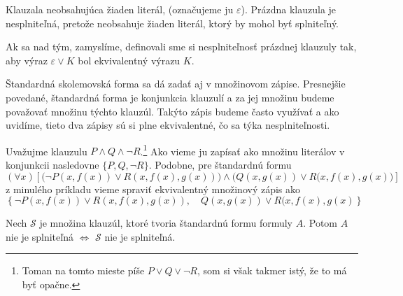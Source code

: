 \begin{definicia}
    Klauzala neobsahujúca žiaden literál, (označujeme ju $\varepsilon$).
    Prázdna klauzula je nesplniteľná, pretože neobsahuje žiaden
    literál, ktorý by mohol byť splniteľný.    
\end{definicia}
\begin{poznamka}
    Ak sa nad tým, zamyslíme, definovali sme si nesplniteľnosť
    prázdnej klauzuly tak, aby výraz $\varepsilon \lor K$ bol
    ekvivalentný výrazu $K$.
\end{poznamka}

\begin{poznamka}
    Štandardná skolemovská forma sa dá zadať aj v množinovom zápise.
    Presnejšie povedané, štandardná forma je konjunkcia klauzulí a
    za jej množinu budeme považovať množinu týchto klauzúl.
    Takýto zápis budeme často využívať a ako uvidíme, tieto dva zápisy
    sú si plne ekvivalentné, čo sa týka nesplniteľnosti.
\end{poznamka}


\begin{priklad}
    Uvažujme klauzulu $P \land Q \land \neg R$.\footnote{
    Toman na tomto mieste píše $P \lor Q \lor \neg R$, som si však
    takmer istý, že to má byť opačne.
    }
    Ako vieme ju zapísať ako
    množinu literálov v konjunkcii nasledovne
    $\{P, Q, \neg R\}$.
    Podobne, pre štandardnú formu
    \begin{equation*}
        (\forall x) \left[
            \Big(\neg P(x,f(x)) \lor R(x,f(x),g(x)) \Big) \land
            \Big( Q(x,g(x))\lor R(x,f(x),g(x) \Big) \right]
    \end{equation*}
    z minulého príkladu vieme spraviť ekvivalentný množinový zápis ako
    \begin{equation*}
        \left\{
            \neg P(x,f(x)) \lor R(x,f(x),g(x)), \quad
            Q(x,g(x))\lor R(x,f(x),g(x) 
        \right\}
    \end{equation*}
\end{priklad}

\begin{veta}
    Nech $\mathscr{S}$ je množina klauzúl, ktoré tvoria štandardnú
    formu formuly $A$. Potom $A$ nie je splniteľná $\iff$ $\mathscr{S}$
    nie je splniteľná.
\end{veta}

